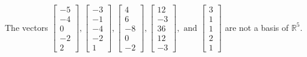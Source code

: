 \begin{exercise}
\begin{exerciseStatement}
  \end{exerciseStatement}
  \begin{exerciseAnswer}
   The vectors \(\left[\begin{array}{r}
-5 \\
-4 \\
0 \\
-2 \\
2
\end{array}\right] , \left[\begin{array}{r}
-3 \\
-1 \\
-4 \\
-2 \\
1
\end{array}\right] , \left[\begin{array}{r}
4 \\
6 \\
-8 \\
0 \\
-2
\end{array}\right] , \left[\begin{array}{r}
12 \\
-3 \\
36 \\
12 \\
-3
\end{array}\right] , \text{ and } \left[\begin{array}{r}
3 \\
1 \\
1 \\
2 \\
1
\end{array}\right]\) 
  	 are not  a basis of \(\mathbb{R}^5\).
  


  \end{exerciseAnswer}
\end{exercise}